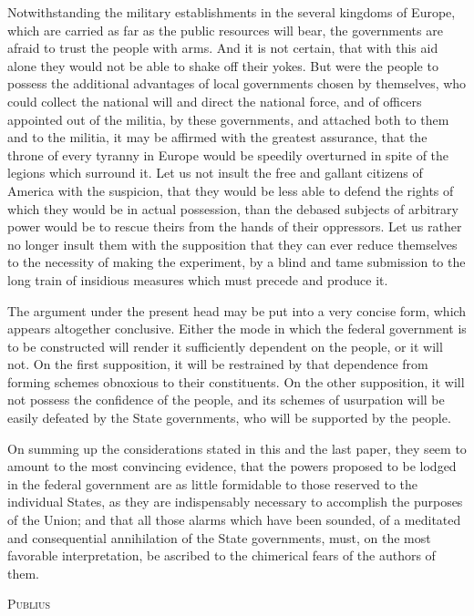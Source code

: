 Notwithstanding the military establishments in the several kingdoms of Europe, which are carried as far as the public resources will bear, the governments are afraid to trust the people with arms. 
And it is not certain, that with this aid alone they would not be able to shake off their yokes. 
But were the people to possess the additional advantages of local governments chosen by themselves, who could collect the national will and direct the national force, and of officers appointed out of the militia, by these governments, and attached both to them and to the militia, it may be affirmed with the greatest assurance, that the throne of every tyranny in Europe would be speedily overturned in spite of the legions which surround it. 
Let us not insult the free and gallant citizens of America with the suspicion, that they would be less able to defend the rights of which they would be in actual possession, than the debased subjects of arbitrary power would be to rescue theirs from the hands of their oppressors. 
Let us rather no longer insult them with the supposition that they can ever reduce themselves to the necessity of making the experiment, by a blind and tame submission to the long train of insidious measures which must precede and produce it.

The argument under the present head may be put into a very concise form, which appears altogether conclusive. 
Either the mode in which the federal government is to be constructed will render it sufficiently dependent on the people, or it will not. 
On the first supposition, it will be restrained by that dependence from forming schemes obnoxious to their constituents. 
On the other supposition, it will not possess the confidence of the people, and its schemes of usurpation will be easily defeated by the State governments, who will be supported by the people.

On summing up the considerations stated in this and the last paper, they seem to amount to the most convincing evidence, that the powers proposed to be lodged in the federal government are as little formidable to those reserved to the individual States, as they are indispensably necessary to accomplish the purposes of the Union; and that all those alarms which have been sounded, of a meditated and consequential annihilation of the State governments, must, on the most favorable interpretation, be ascribed to the chimerical fears of the authors of them.

\vspace{.5cm}
\textsc{Publius}

\vspace{1.5cm}

